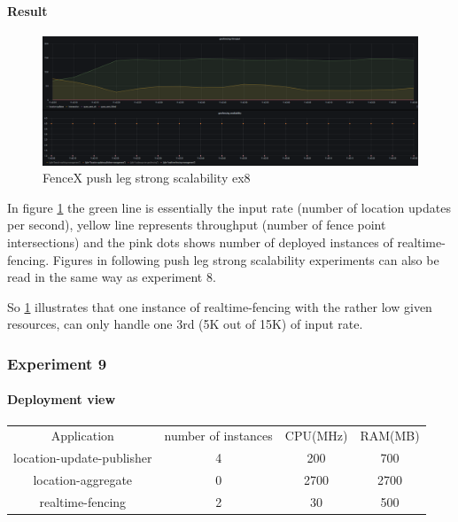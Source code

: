 \documentclass[a4]{report}
\begin{document}
    \paragraph{Result}
    \begin{figure}[ht]
        \caption{FenceX push leg strong scalability ex8}
        \label{fig:ex8}
        \includegraphics[scale=0.4]{images/evaluation/ex8-benchmarking-ongoing-2per4sec.png}
    \end{figure}

    In figure \ref{fig:ex8} the green line is essentially the input rate (number of location updates per second),
    yellow line represents throughput (number of fence point intersections) and the pink dots shows number of
    deployed instances of realtime-fencing.
    Figures in following push leg strong scalability experiments can also be read in the same way as experiment 8.

    So \ref{fig:ex8} illustrates that one instance of realtime-fencing with the rather low given resources, can only
    handle one 3rd (5K out of 15K) of input rate.


    \subsubsection{Experiment 9}
    \paragraph{Deployment view}
    \begin{center}
        \begin{tabular}{ c c c c }
            Application               &  number of instances     & CPU(MHz)  & RAM(MB)    \\
            location-update-publisher &          4               & 200       &   700      \\
            location-aggregate        &          0               & 2700      &   2700     \\
            realtime-fencing          &          2               & 30       &   500       \\
        \end{tabular}
    \end{center}
\end{document}
